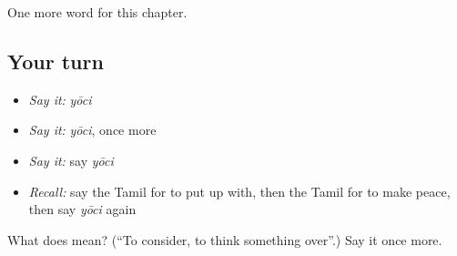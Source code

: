 \begin{grammarlens}[title={What you've built}]
One more word for this chapter.
\end{grammarlens}

\subsection*{Your turn}
\begin{itemize}
\raggedright
  \item \emph{Say it:} \emph{yōci}
  \item \emph{Say it:} \emph{yōci}, once more
  \item \emph{Say it:} say \emph{yōci}
  \item \emph{Recall:} say the Tamil for to put up with, then the Tamil for to make peace, then say \emph{yōci} again
\end{itemize}

\begin{tcolorbox}[breakable,colback=teal!4,colframe=teal!35!black,title={Before you move on}]
What does  mean? (\textquotedblleft{}To consider, to think something over\textquotedblright{}.) Say it once more.
\end{tcolorbox}
